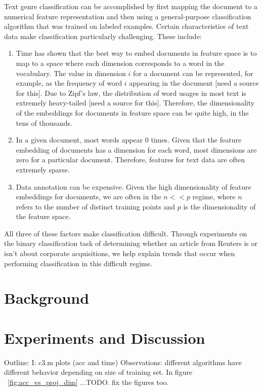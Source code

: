\documentclass[]{article}
\begin{document}
Text genre classification can be accomplished by first mapping the document to a numerical feature representation and then using a general-purpose classification algorithm that was trained on labeled examples. Certain characteristics of text data make classification particularly challenging. These include:
\begin{enumerate}
\item Time has shown that the best way to embed documents in feature space is to map to a space where each dimension corresponds to a word in the vocabulary. The value in dimension $i$ for a document can be represented, for example, as the frequency of word $i$ appearing in the document [need a source for this]. Due to Zipf's law, the distribution of word usages in most text is extremely heavy-tailed [need a source for this]. Therefore, the dimensionality of the embeddings for documents in feature space can be quite high, in the tens of thousands. 
\item  In a given document, most words appear 0 times. Given that the feature embedding of documents has a dimension for each word, most dimensions are zero for a particular document. Therefore, features for text data are often extremely sparse. 
\item Data annotation can be expensive. Given the high dimensionality of feature embeddings for documents, we are often in the $n << p$ regime, where $n$ refers to the number of distinct training points and $p$ is the dimensionality of the feature space. 
\end{enumerate}
All three of these factors make classification difficult. Through experiments on the binary classification task of determining whether an article from Reuters is or isn't about corporate acquisitions, we help explain trends that occur when performing classification in this difficult regime. 
\section{Background}
\section{Experiments and Discussion}
Outline: 
I: c3.m plots (acc and time)
Observations: different algorithms have different behavior depending on size of training set. 
In figure ~\ref{fig:acc_vs_proj_dim} ...TODO. fix the figures too.
\end{document}
